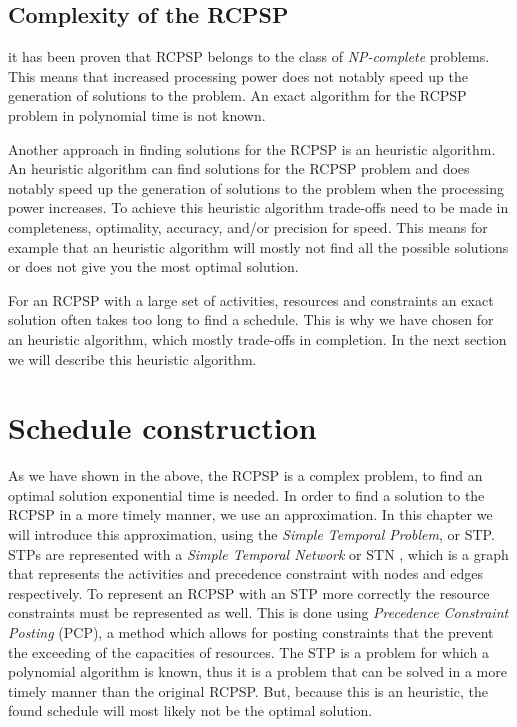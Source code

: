 \documentclass{article}
\theoremstyle{definition}
\begin{document}
\subsection{Complexity of the RCPSP}
\label{text:complex}
it has been proven that RCPSP belongs to the class of \emph{NP-complete} problems.
This means that increased processing power does not notably speed up the generation of solutions to the problem.
An exact algorithm for the RCPSP problem in polynomial time is not known.

Another approach in finding solutions for the RCPSP is an heuristic algorithm.
An heuristic algorithm can find solutions for the RCPSP problem and does notably speed up the generation of solutions to the problem when the processing power increases.
To achieve this heuristic algorithm trade-offs need to be made in completeness, optimality, accuracy, and/or precision for speed.
This means for example that an heuristic algorithm will mostly not find all the possible solutions or does not give you the most optimal solution.

For an RCPSP with a large set of activities, resources and constraints an exact solution often takes too long to find a schedule.
This is why we have chosen for an heuristic algorithm, which mostly trade-offs in completion.
In the next section we will describe this heuristic algorithm.


\newpage


\section{Schedule construction}
\label{text:schedule}

As we have shown in the above, the RCPSP is a complex problem, to find an optimal solution exponential time is needed.
In order to find a solution to the RCPSP in a more timely manner, we use an approximation.
In this chapter we will introduce this approximation, using the \emph{Simple Temporal Problem}, or STP.
STPs are represented with a \emph{Simple Temporal Network} or STN \cite{dechter91}, which is a graph that represents the activities and precedence constraint with nodes and edges respectively.
To represent an RCPSP with an STP more correctly the resource constraints must be represented as well. 
This is done using \emph{Precedence Constraint Posting} (PCP), a method which allows for posting constraints that the prevent the exceeding of the capacities of resources.
The STP is a problem for which a polynomial algorithm is known, thus it is a problem that can be solved in a more timely manner than the original RCPSP.
But, because this is an heuristic, the found schedule will most likely not be the optimal solution.
\end{document}
